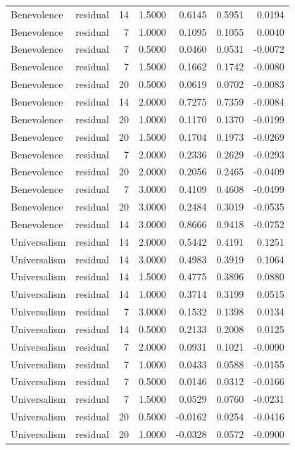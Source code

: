 \begin{tabular}{llrrrrr}
Benevolence & residual & 14 & 1.5000 & 0.6145 & 0.5951 & 0.0194 \\
Benevolence & residual & 7 & 1.0000 & 0.1095 & 0.1055 & 0.0040 \\
Benevolence & residual & 7 & 0.5000 & 0.0460 & 0.0531 & -0.0072 \\
Benevolence & residual & 7 & 1.5000 & 0.1662 & 0.1742 & -0.0080 \\
Benevolence & residual & 20 & 0.5000 & 0.0619 & 0.0702 & -0.0083 \\
Benevolence & residual & 14 & 2.0000 & 0.7275 & 0.7359 & -0.0084 \\
Benevolence & residual & 20 & 1.0000 & 0.1170 & 0.1370 & -0.0199 \\
Benevolence & residual & 20 & 1.5000 & 0.1704 & 0.1973 & -0.0269 \\
Benevolence & residual & 7 & 2.0000 & 0.2336 & 0.2629 & -0.0293 \\
Benevolence & residual & 20 & 2.0000 & 0.2056 & 0.2465 & -0.0409 \\
Benevolence & residual & 7 & 3.0000 & 0.4109 & 0.4608 & -0.0499 \\
Benevolence & residual & 20 & 3.0000 & 0.2484 & 0.3019 & -0.0535 \\
Benevolence & residual & 14 & 3.0000 & 0.8666 & 0.9418 & -0.0752 \\
Universalism & residual & 14 & 2.0000 & 0.5442 & 0.4191 & 0.1251 \\
Universalism & residual & 14 & 3.0000 & 0.4983 & 0.3919 & 0.1064 \\
Universalism & residual & 14 & 1.5000 & 0.4775 & 0.3896 & 0.0880 \\
Universalism & residual & 14 & 1.0000 & 0.3714 & 0.3199 & 0.0515 \\
Universalism & residual & 7 & 3.0000 & 0.1532 & 0.1398 & 0.0134 \\
Universalism & residual & 14 & 0.5000 & 0.2133 & 0.2008 & 0.0125 \\
Universalism & residual & 7 & 2.0000 & 0.0931 & 0.1021 & -0.0090 \\
Universalism & residual & 7 & 1.0000 & 0.0433 & 0.0588 & -0.0155 \\
Universalism & residual & 7 & 0.5000 & 0.0146 & 0.0312 & -0.0166 \\
Universalism & residual & 7 & 1.5000 & 0.0529 & 0.0760 & -0.0231 \\
Universalism & residual & 20 & 0.5000 & -0.0162 & 0.0254 & -0.0416 \\
Universalism & residual & 20 & 1.0000 & -0.0328 & 0.0572 & -0.0900 \\

\end{tabular}
